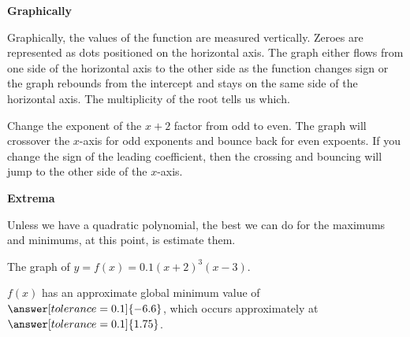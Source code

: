 \documentclass{ximera}
\begin{document}
\textbf{\textcolor{purple!85!blue}{Graphically}} 

Graphically, the values of the function are measured vertically. Zeroes are represented as dots positioned on the horizontal axis.  The graph either flows from one side of the horizontal axis to the other side as the function changes sign or the graph rebounds from the intercept and stays on the same side of the horizontal axis.  The multiplicity of the root tells us which.






\begin{example}

Change the exponent of the $x+2$ factor from odd to even.  The graph will crossover the $x$-axis for odd exponents and bounce back for even expoents.  If you change the sign of the leading coefficient, then the crossing and bouncing will jump to the other side of the $x$-axis.



\begin{center}
\end{center}

\end{example}






















\textbf{\textcolor{purple!85!blue}{Extrema}} 

Unless we have a quadratic polynomial, the best we can do for the maximums and minimums, at this point, is estimate them.







\begin{example}

The graph of $y = f(x) = 0.1(x+2)^3(x-3)$.



\begin{center}
\end{center}



$f(x)$ has an approximate global minimum value of $\answer[tolerance=0.1]{-6.6}$, which occurs approximately at $\answer[tolerance=0.1]{1.75}$.


\end{example}
\end{document}
